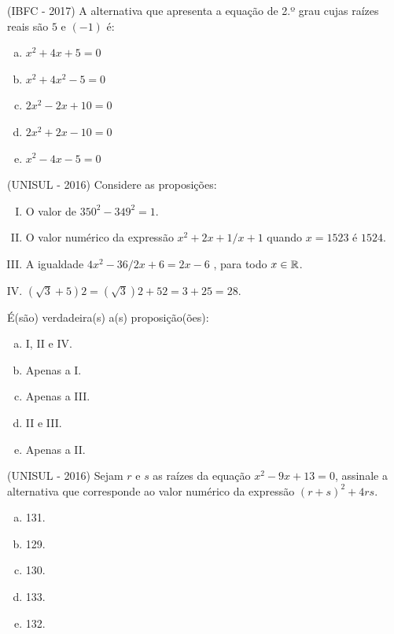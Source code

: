  \begin{exer}
 (IBFC - 2017) A alternativa que apresenta a equação de 2.º grau cujas raízes reais são $5$ e $(-1)$ é:
 \begin{enumerate}[a)]
 \item $x^2 + 4x + 5 = 0$
 \item $x^2 + 4x^2 - 5 = 0$
 \item $2x^2 - 2x + 10 = 0$
 \item $2x^2 + 2x - 10 = 0$
 \item $x^2 - 4x - 5 = 0$
 \end{enumerate}
 \end{exer}

 \begin{exer}
  (UNISUL - 2016) Considere as proposições:
 \begin{enumerate}[I)]
 \item O valor de $350^2 - 349^2 = 1$.
 \item O valor numérico da expressão  $x^2+ 2x + 1 / x+1$ quando $x = 1523$ é $1524$.
 \item A igualdade $4x^2 - 36 / 2x + 6 = 2x - 6$ , para todo $x \in \mathbb{R}$.
 \item $(\sqrt{3} + 5)2 = (\sqrt{3})2 + 52 = 3 + 25 =28$.
 \end{enumerate}
 É(são) verdadeira(s) a(s) proposição(ões):
 \begin{enumerate}[a)]
 \item I, II e IV.
 \item Apenas a I.
 \item Apenas a III.
 \item II e III.
 \item Apenas a II.
 \end{enumerate}
 \end{exer}

 \begin{exer}
 (UNISUL - 2016) Sejam $r$ e $s$ as raízes da equação $x^2 - 9x + 13 = 0$, assinale a alternativa que corresponde ao valor numérico da expressão $(r + s)^2 + 4rs$.
 \begin{multicols}{5}
 \begin{enumerate}[a)]
 \item 131.
 \item 129.
 \item 130.
 \item 133.
 \item 132.
 \end{enumerate}
 \end{multicols}
 \end{exer}

